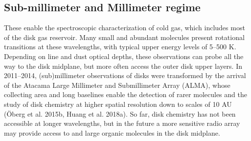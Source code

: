 \subsection{Sub-millimeter and Millimeter regime}
These enable the spectroscopic characterization of cold gas, which includes most of the disk gas reservoir. Many small and abundant molecules present rotational transitions at these wavelengths, with typical upper energy levels of 5–500 K. Depending on line and dust optical depths, these observations can probe all the way to the disk midplane, but more often access the outer disk upper layers. In 2011–2014, (sub)millimeter observations of disks were transformed by the arrival of the Atacama Large Millimeter and Submillimeter Array (ALMA), whose collecting area and long baselines enable the detection of rarer molecules and the study of disk chemistry at higher spatial resolution down to scales of 10 AU (Öberg et al. 2015b, Huang et al. 2018a). So far, disk chemistry has not been accessible at longer wavelengths, but in the future a more sensitive radio array may provide access to  and large organic molecules in the disk midplane.




         




